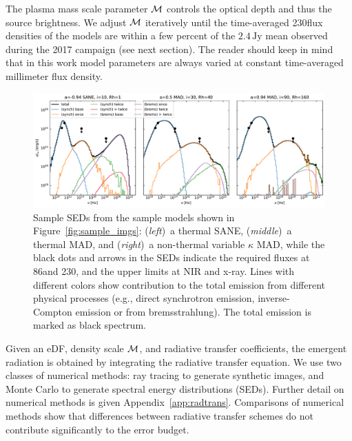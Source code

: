 The plasma mass scale parameter $\mathcal{M}$ controls the optical depth and thus the source brightness.  We adjust $\mathcal{M}$ iteratively until the time-averaged 230\GHz flux densities of the models are within a few percent of the $2.4\,\mathrm{Jy}$ mean observed during the 2017 campaign (see next section).  The reader should keep in mind that in this work model parameters are always varied at constant time-averaged millimeter flux density.



\begin{figure}
  \centering
  \includegraphics[width=\textwidth]{figures/sample_seds.pdf}
  \caption{Sample SEDs from the sample models shown in
    Figure~\ref{fig:sample_imgs}:
    (\emph{left})~a thermal SANE,
    (\emph{middle})~a thermal MAD, and
    (\emph{right})~a non-thermal variable $\kappa$ MAD,
    while the black dots and arrows in the SEDs indicate the required
    fluxes at 86\GHz and 230\GHz, and the upper limits at NIR and x-ray.
    Lines with different colors show contribution to the total
    emission from different physical processes (e.g., direct
    synchrotron emission, inverse-Compton emission or from
    bremsstrahlung).
    The total emission is marked as black spectrum.
      }
  \label{fig:sample_SEDs}
\end{figure}

Given an eDF, density scale $\mathcal{M}$, and radiative transfer coefficients, the emergent radiation is obtained by integrating the radiative transfer equation.
We use two classes of numerical methods: ray tracing to generate synthetic images, and Monte Carlo to generate spectral energy distributions (SEDs).
Further detail on numerical methods is given Appendix~\ref{app:radtrans}.
Comparisons of numerical methods \citep{2020ApJ...897..148G, Prather_et_al_2022} show that differences between radiative transfer schemes do not contribute significantly to the error budget.

